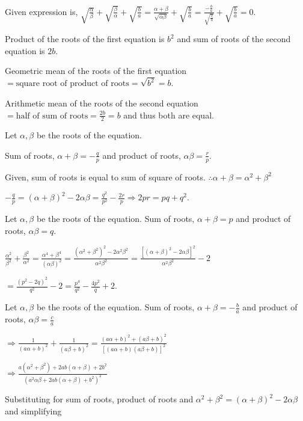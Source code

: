   Given expression is, $\sqrt{\frac{\alpha}{\beta}} + \sqrt{\frac{\beta}{\alpha}} + \sqrt{\frac{b}{a}} =
  \frac{\alpha + \beta}{\sqrt{\alpha\beta}} + \sqrt{\frac{b}{a}} =
  \frac{-\frac{b}{a}}{\sqrt{\frac{b}{a}}} + \sqrt{\frac{b}{a}} = 0$.
\item Product of the roots of the first equation is $ b^2$ and sum of roots of the second equation is $2b$.

  Geometric mean of the roots of the first equation $= \text{square root of product of roots} = \sqrt{b^2} =
  b$.

  Arithmetic mean of the roots of the second equation $= \text{half of sum of roots} = \frac{2b}{2} = b$ and
  thus both are equal.
\item Let $\alpha, \beta$ be the roots of the equation.

  Sum of roots, $\alpha + \beta = -\frac{q}{p}$ and product of roots, $\alpha\beta = \frac{r}{p}$.

  Given, sum of roots is equal to sum of square of roots. $\therefore \alpha + \beta = \alpha^2 + \beta^2$

  $-\frac{q}{p} = (\alpha + \beta)^2 - 2\alpha\beta = \frac{q^2}{p^2} - \frac{2r}{p}\Rightarrow 2pr = pq +
  q^2$.
\item Let $\alpha, \beta$ be the roots of the equation. Sum of roots, $\alpha + \beta = p$ and product of
  roots, $\alpha\beta = q$.

  $\frac{\alpha^2}{\beta^2} + \frac{\beta^2}{\alpha^2} = \frac{\alpha^4 + \beta^4}{(\alpha\beta)^2} =
  \frac{(\alpha^2 + \beta^2)^2 - 2\alpha^2\beta^2}{\alpha^2\beta^2} = \frac{[(\alpha + \beta)^2 -
      2\alpha\beta]^2}{\alpha^2\beta^2} - 2$

  $= \frac{(p^2 - 2q)^2}{q^2} - 2 = \frac{p^4}{q^2} - \frac{4p^2}{q} + 2$.
\item Let $\alpha, \beta$ be the roots of the equation. Sum of roots, $\alpha + \beta = -\frac{b}{a}$ and
  product of roots, $\alpha\beta = \frac{c}{a}$

  $\Rightarrow \frac{1}{(a\alpha + b)^2} + \frac{1}{(a\beta + b)^2} = \frac{(a\alpha + b)^2 + (a\beta +
    b)^2}{[(a\alpha + b)(a\beta + b)]^2}$

  $\Rightarrow \frac{a(\alpha^2 + \beta^2) + 2ab(\alpha + \beta) + 2b^2}{(a^2\alpha\beta + 2ab(\alpha +
    \beta) + b^2)^2}$

  Substituting for sum of roots, product of roots and $\alpha^2 + \beta^2 = (\alpha + \beta)^2 -
  2\alpha\beta$ and simplifying

